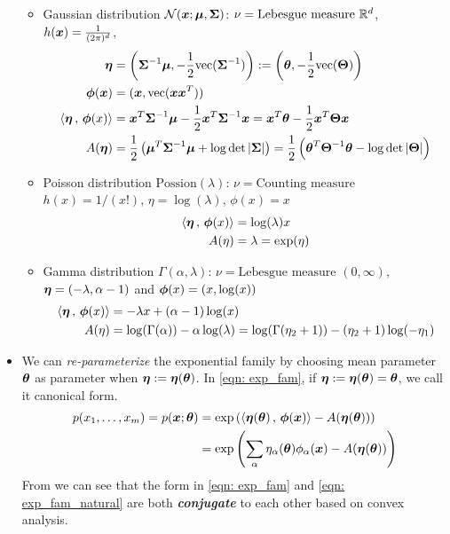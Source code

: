 \documentclass[11pt]{article}
\begin{document}
\begin{itemize}
\begin{itemize}
\item Gaussian distribution ${\mathcal N}(\boldsymbol{x}; \boldsymbol{\mu}, \boldsymbol{\Sigma})$: $\nu = \text{Lebesgue measure } {\mathbb R}^d$, $h(\boldsymbol{x}) = \frac{1}{(2\pi)^d}$, 
\begin{align}
\boldsymbol{\eta} &= \left(\boldsymbol{\Sigma}^{-1}\boldsymbol{\mu}, - \frac{1}{2} \text{vec}(\boldsymbol{\Sigma}^{-1})\right) : = \left(\boldsymbol{\theta}, -\frac{1}{2}\text{vec}(\boldsymbol{\Theta})\right) \label{eqn: gaussian_natural_param}\\
\boldsymbol{\phi}(\boldsymbol{x}) &= (\boldsymbol{x}, \text{vec}(\boldsymbol{x}\boldsymbol{x}^{T}))  \label{eqn: gaussian_sufficient_stats}\\
\left\langle \boldsymbol{\eta}\,,\, \boldsymbol{\phi}(x) \right\rangle &= \boldsymbol{x}^{T}\boldsymbol{\Sigma}^{-1}\boldsymbol{\mu} - \frac{1}{2}\boldsymbol{x}^{T}\boldsymbol{\Sigma}^{-1}\boldsymbol{x} = \boldsymbol{x}^{T}\boldsymbol{\theta} - \frac{1}{2}\boldsymbol{x}^{T}\boldsymbol{\Theta}\boldsymbol{x} \nonumber\\
A(\boldsymbol{\eta}) &= \frac{1}{2}\left(\boldsymbol{\mu}^{T}\boldsymbol{\Sigma}^{-1}\boldsymbol{\mu} + \log \det\left\lvert \boldsymbol{\Sigma} \right\rvert\right) = \frac{1}{2}\left(\boldsymbol{\theta}^{T}\boldsymbol{\Theta}^{-1}\boldsymbol{\theta} - \log \det\left\lvert \boldsymbol{\Theta} \right\rvert\right)  \label{eqn: gaussian_partition_fun}
\end{align}

\item Poisson distribution $\text{Possion}(\lambda)$: $\nu = \text{Counting measure}$ $h(x) = 1/(x!)$, $\eta =  \log(\lambda)$, $\phi(x) = x$
\begin{align*}
\left\langle \boldsymbol{\eta}\,,\, \boldsymbol{\phi}(x) \right\rangle &= \log(\lambda)x \\
A(\eta) &=\lambda =  \exp(\eta)
\end{align*}

\item Gamma distribution $\Gamma(\alpha, \lambda)$: $\nu = \text{Lebesgue measure } (0,\infty)$, $\boldsymbol{\eta} = (-\lambda, \alpha - 1)$  and $\boldsymbol{\phi}(x) = (x, \log(x))$
\begin{align*}
\left\langle \boldsymbol{\eta}\,,\, \boldsymbol{\phi}(x) \right\rangle &= -\lambda x + (\alpha - 1)\log(x)  \\
A(\eta) &=\log(\Gamma(\alpha)) - \alpha \log(\lambda) = \log(\Gamma(\eta_2 + 1)) - (\eta_2 + 1) \log(-\eta_1) 
\end{align*}
\end{itemize}


\item We can \emph{re-parameterize} the exponential family by choosing mean parameter $\boldsymbol{\theta}$ as parameter when $\boldsymbol{\eta}:= \boldsymbol{\eta}(\boldsymbol{\theta})$. In \eqref{eqn: exp_fam}, if $\boldsymbol{\eta}:= \boldsymbol{\eta}(\boldsymbol{\theta}) = \boldsymbol{\theta}$, we call it canonical form. 
\begin{align}
p(x_1, \ldots, x_{m}) = p(\boldsymbol{x}; \boldsymbol{\theta}) &= \exp\left(\left\langle \boldsymbol{\eta}(\boldsymbol{\theta})\,,\, \boldsymbol{\phi}(\boldsymbol{x}) \right\rangle - A(\boldsymbol{\eta}(\boldsymbol{\theta}))\right) \nonumber \\
&= \exp\left(\sum_{\alpha}\eta_{\alpha}(\boldsymbol{\theta})\phi_{\alpha}(\boldsymbol{x}) -  A(\boldsymbol{\eta}(\boldsymbol{\theta}))\right) \label{eqn: exp_fam_natural}
\end{align}
From \citep{wainwright2008graphical} we can see that the form in \eqref{eqn: exp_fam} and \eqref{eqn: exp_fam_natural} are both \emph{\textbf{conjugate}} to each other based on convex analysis.



\end{itemize}
\end{document}
